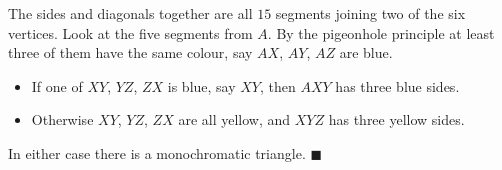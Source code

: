 The sides and diagonals together are all $15$ segments joining two of the six vertices. Look at the five segments from $A$. By the pigeonhole principle at least three of them have the same colour, say $AX$, $AY$, $AZ$ are blue.
\begin{itemize}
\item If one of $XY$, $YZ$, $ZX$ is blue, say $XY$, then $AXY$ has three blue sides.
\item Otherwise $XY$, $YZ$, $ZX$ are all yellow, and $XYZ$ has three yellow sides.
\end{itemize}
In either case there is a monochromatic triangle. $\blacksquare$
